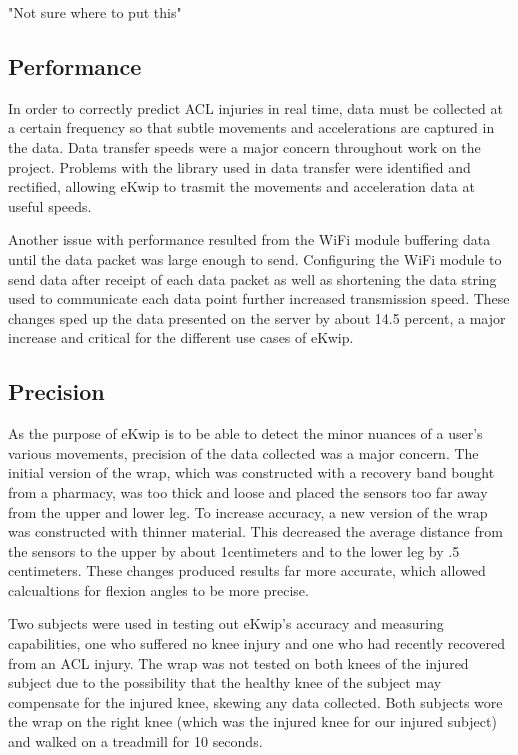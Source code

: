 "Not sure where to put this"
\subsection {Performance}
In order to correctly predict ACL injuries in real time, data must be collected at a certain frequency so that subtle movements and accelerations are captured in the data. Data transfer speeds were a major concern throughout work on the project. Problems with the library used in data transfer were identified and rectified, allowing eKwip to trasmit the movements and acceleration data at useful speeds.

Another issue with performance resulted from the WiFi module buffering data until the data packet was large enough to send.  Configuring the WiFi module to send data after receipt of each data packet as well as shortening the data string used to communicate each data point further increased transmission speed. These changes sped up the data presented on the server by about 14.5 percent, a major increase and critical for the different use cases of eKwip. 

\subsection {Precision}
As the purpose of eKwip is to be able to detect the minor nuances of a user’s various movements, precision of the data collected was a major concern. The initial version of the wrap, which was constructed with a recovery band bought from a pharmacy, was too thick and loose and placed the sensors too far away from the upper and lower leg. To increase accuracy, a new version of the wrap was constructed with thinner material. This decreased the average distance from the sensors to the upper by about 1centimeters and to the lower leg by .5 centimeters. These changes produced results far more accurate, which allowed calcualtions for flexion angles to be more precise. 

Two subjects were used in testing out eKwip's accuracy and measuring capabilities, one who suffered no knee injury and one who had recently recovered from an ACL injury. The wrap was not tested on both knees of the injured subject due to the possibility that the healthy knee of the subject may compensate for the injured knee, skewing any data collected. Both subjects wore the wrap on the right knee (which was the injured knee for our injured subject) and walked on a treadmill for 10 seconds.

